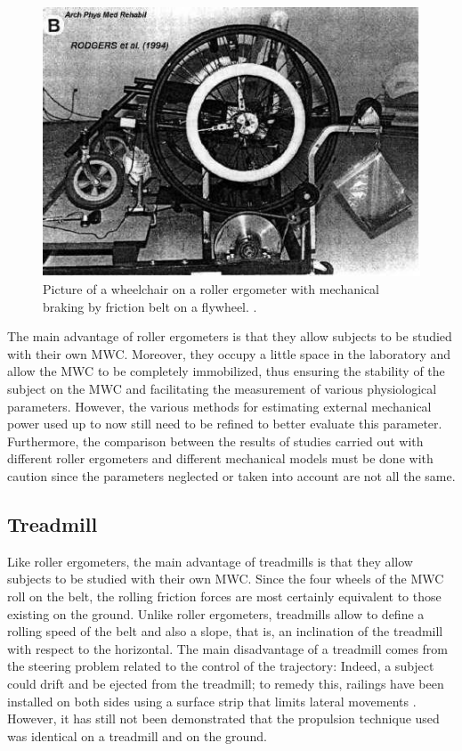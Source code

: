 \begin{figure}[h]
\center
\includegraphics[scale = 25]{images/FRER}
\caption{Picture of a wheelchair on a roller ergometer with mechanical braking by friction belt on a flywheel. \cite{rodgers1994biomechanics}.}
\label{FRER}
\end{figure}

The main advantage of roller ergometers is that they allow subjects to be studied with their own MWC. Moreover, they occupy a little space in the laboratory and allow the MWC to be completely immobilized, thus ensuring the stability of the subject on the MWC and facilitating the measurement of  various physiological parameters. However, the various methods for estimating external  mechanical power used up to now still need to be refined to better evaluate this parameter. Furthermore, the comparison between the results of studies carried out with different roller ergometers and different mechanical models must be done with caution since the parameters neglected or taken into account are not all the same.

\subsection{Treadmill}
Like roller ergometers, the main advantage of treadmills is that they allow subjects to be studied with their own MWC. Since the four wheels of the MWC roll on the belt, the rolling friction forces are most certainly equivalent to those existing on the ground. Unlike roller ergometers, treadmills  allow to define a rolling speed of the belt and also a slope, that is, an inclination of the treadmill with respect to the horizontal. The main disadvantage of a treadmill comes from the steering problem related to the control of the trajectory: Indeed, a subject could drift and be ejected from the treadmill; to remedy this, railings have been installed on both sides using a surface strip that limits lateral movements \cite{claremont1985model}. However, it has still not been demonstrated that the propulsion technique used was identical on a treadmill and on the ground.

